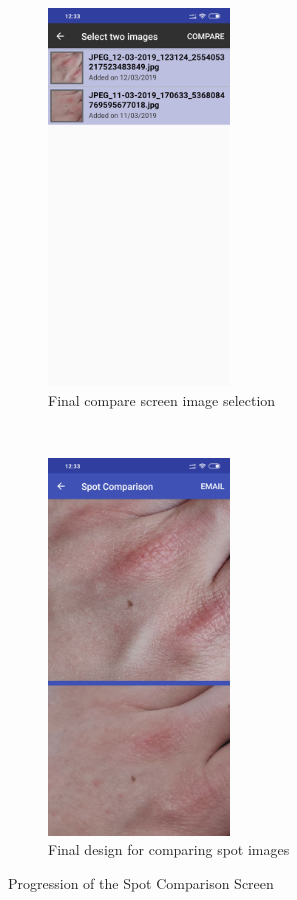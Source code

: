 \begin{figure}[t!]
\begin{subfigure}[t]{0.5\textwidth}
        \centering
        \includegraphics[height=10cm]{figures/compare1_android.png}
        \caption{Final compare screen image selection}
        \label{fig:newcompare1secondfig}
    \end{subfigure}%
    ~
    \begin{subfigure}[t]{0.5\textwidth}
        \centering
        \includegraphics[height=10cm]{figures/compare2_android.png}
        \caption{Final design for comparing spot images}
        \label{fig:newcompare2}
    \end{subfigure}
    \caption{Progression of the Spot Comparison Screen}
    \label{fig:comparisonallfigures}
\end{figure}

